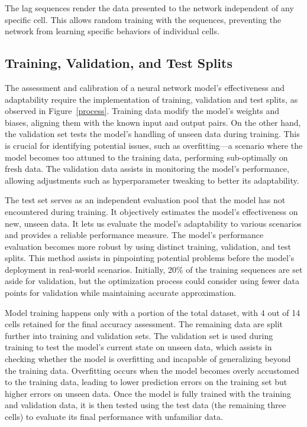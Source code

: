 \documentclass[energies,article,accept,pdftex,moreauthors]{Definitions/mdpi}
\begin{document}
The lag sequences render the data presented to the network independent of any specific cell. This allows random training with the sequences, preventing the network from learning specific behaviors of individual cells.

\subsection{Training, Validation, and Test Splits}

The assessment and calibration of a neural network model's effectiveness and adaptability require the implementation of training, validation and test splits, as observed in Figure~\ref{process}. Training data modify the model's weights and biases, aligning them with the known input and output pairs. On the other hand, the validation set tests the model's handling of unseen data during training. This is crucial for identifying potential issues, such as overfitting---a scenario where the model becomes too attuned to the training data, performing sub-optimally on fresh data. The validation data assists in monitoring the model's performance, allowing adjustments such as hyperparameter tweaking to better its adaptability.

The test set serves as an independent evaluation pool that the model has not encountered during training. It objectively estimates the model's effectiveness on new, unseen data. It lets us evaluate the model's adaptability to various scenarios and provides a reliable performance measure. The model's performance evaluation becomes more robust by using distinct training, validation, and test splits. This method assists in pinpointing potential problems before the model's deployment in real-world scenarios. Initially, 20\% of the training sequences are set aside for validation, but the optimization process could consider using fewer data points for validation while maintaining accurate approximation.

Model training happens only with a portion of the total dataset, with 4 out of 14 cells retained for the final accuracy assessment. The remaining data are split further into training and validation sets. The validation set is used during training to test the model's current state on unseen data, which assists in checking whether the model is overfitting and incapable of generalizing beyond the training data. Overfitting occurs when the model becomes overly accustomed to the training data, leading to lower prediction errors on the training set but higher errors on unseen data. Once the model is fully trained with the training and validation data, it is then tested using the test data (the remaining three cells) to evaluate its final performance with unfamiliar data. 
\end{document}
